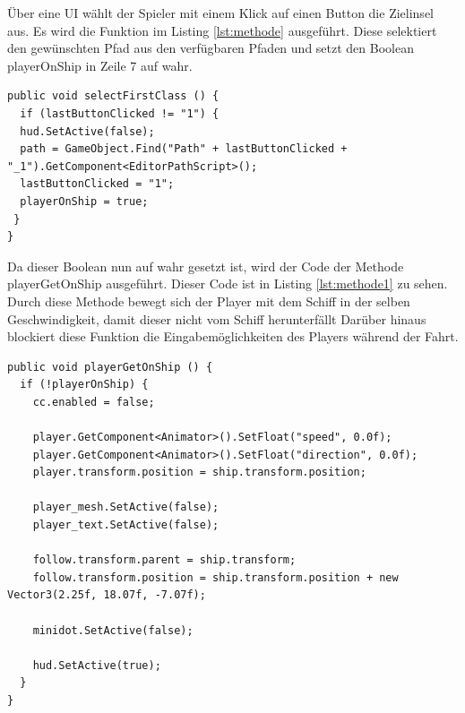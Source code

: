 			Über eine \ac{UI} wählt der Spieler mit einem Klick auf einen Button die Zielinsel aus. Es wird die Funktion im Listing \ref{lst:methode} ausgeführt. Diese selektiert den gewünschten Pfad aus den verfügbaren Pfaden und setzt den Boolean playerOnShip in Zeile 7 auf wahr. 

\begin{scriptsize}
\lstset{
	float,
	caption=Methode: selectFirstClass, 
	language=[Sharp]C, 
	frame=single,  
	showstringspaces=false, 
	showspaces=false, 
	numbers=left, 
	captionpos=b, 
	belowcaptionskip=4pt,
	basicstyle=\ttfamily
} 
\begin{lstlisting}[label=lst:methode]
public void selectFirstClass () {
  if (lastButtonClicked != "1") {
  hud.SetActive(false);
  path = GameObject.Find("Path" + lastButtonClicked + "_1").GetComponent<EditorPathScript>();
  lastButtonClicked = "1";
  playerOnShip = true;
 }
}
\end{lstlisting}
\end{scriptsize}

			Da dieser Boolean nun auf wahr gesetzt ist, wird der Code der Methode playerGetOnShip ausgeführt. Dieser Code ist in Listing \ref{lst:methode1} zu sehen. Durch diese Methode bewegt sich der Player mit dem Schiff in der selben Geschwindigkeit, damit dieser nicht vom Schiff herunterfällt Darüber hinaus blockiert diese Funktion die Eingabemöglichkeiten des Players während der Fahrt.

\begin{scriptsize}
\lstset{
	float,
	caption=Methode: playerGetOnShip, 
	language=[Sharp]C, 
	frame=single,  
	showstringspaces=false, 
	showspaces=false, 
	numbers=left, 
	captionpos=b, 
	belowcaptionskip=4pt,
	basicstyle=\ttfamily
} 
\begin{lstlisting}[label=lst:methode1]
public void playerGetOnShip () {
  if (!playerOnShip) {
    cc.enabled = false;

    player.GetComponent<Animator>().SetFloat("speed", 0.0f);
    player.GetComponent<Animator>().SetFloat("direction", 0.0f);
    player.transform.position = ship.transform.position;

    player_mesh.SetActive(false);
    player_text.SetActive(false);

    follow.transform.parent = ship.transform;
    follow.transform.position = ship.transform.position + new Vector3(2.25f, 18.07f, -7.07f);

    minidot.SetActive(false);

    hud.SetActive(true);
  }
}
\end{lstlisting}
\end{scriptsize}

